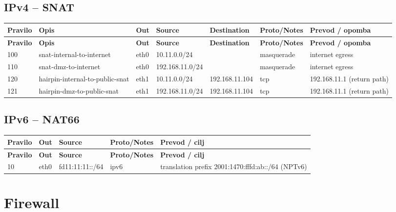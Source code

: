 \documentclass[a4paper,11pt]{article}
\begin{document}
\begin{landscape}
\subsection{IPv4 -- SNAT}
\begin{longtable}{|l|l|l|l|l|l|l|}
\hline
\textbf{Pravilo} & \textbf{Opis} & \textbf{Out} & \textbf{Source} & \textbf{Destination} & \textbf{Proto/Notes} & \textbf{Prevod / opomba} \\
\hline
\endfirsthead
\hline
\textbf{Pravilo} & \textbf{Opis} & \textbf{Out} & \textbf{Source} & \textbf{Destination} & \textbf{Proto/Notes} & \textbf{Prevod / opomba} \\
\hline
\endhead
100 & snat-internal-to-internet & eth0 & 10.11.0.0/24 & & masquerade & internet egress \\
110 & snat-dmz-to-internet & eth0 & 192.168.11.0/24 & & masquerade & internet egress \\
120 & hairpin-internal-to-public-snat & eth1 & 10.11.0.0/24 & 192.168.11.104 & tcp & 192.168.11.1 (return path) \\
121 & hairpin-dmz-to-public-snat & eth1 & 192.168.11.0/24 & 192.168.11.104 & tcp & 192.168.11.1 (return path) \\
\hline
\end{longtable}

\subsection{IPv6 -- NAT66}
\begin{longtable}{|l|l|l|l|l|}
\hline
\textbf{Pravilo} & \textbf{Out} & \textbf{Source} & \textbf{Proto/Notes} & \textbf{Prevod / cilj} \\
\hline
\endfirsthead
\hline
\textbf{Pravilo} & \textbf{Out} & \textbf{Source} & \textbf{Proto/Notes} & \textbf{Prevod / cilj} \\
\hline
\endhead
10 & eth0 & fd11:11:11::/64 & ipv6 & translation prefix 2001:1470:fffd:ab::/64 (NPTv6) \\
\hline
\end{longtable}



\section{Firewall}

\end{landscape}
\end{document}
